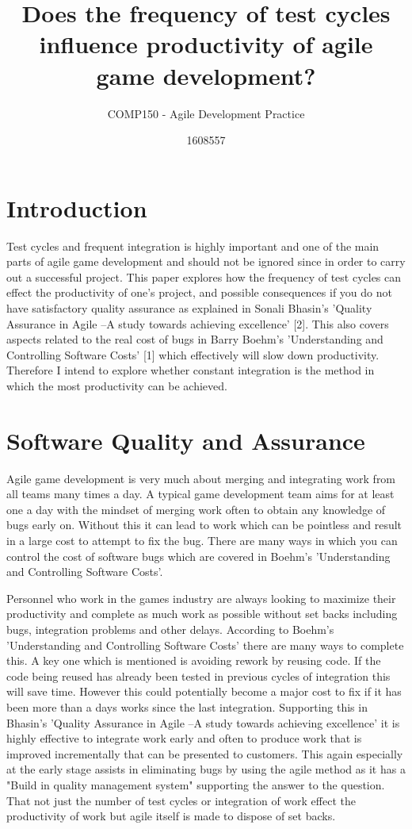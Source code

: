 \documentclass{scrartcl}
\title{Does the frequency of test cycles influence productivity of agile game development? }
\subtitle{COMP150 - Agile Development Practice}
\author{1608557}
\begin{document}
\maketitle



\section{Introduction}

Test cycles and frequent integration is highly important and one of the main parts of agile game development and should not be ignored since in order to carry out a successful project. This paper explores how the frequency of test cycles can effect the productivity of one's project, and possible consequences if you do not have satisfactory quality assurance as explained in Sonali Bhasin's 'Quality Assurance in Agile –A study towards achieving excellence' [2]. This also covers aspects related to the real cost of bugs in Barry Boehm's 'Understanding and Controlling Software Costs' [1]  which effectively will slow down productivity. Therefore I intend to explore whether constant integration is the method in which the most productivity can be achieved. 


\section{Software Quality and Assurance}

Agile game development is very much about merging and integrating work from all teams many times a day. A typical game development team aims for at least one a day with the mindset of merging work often to obtain any knowledge of bugs early on. Without this it can lead to work which can be pointless and result in a large cost to attempt to fix the bug. There are many ways in which you can control the cost of software bugs which are covered in Boehm's 'Understanding and Controlling Software Costs'.  

Personnel who work in the games industry are always looking to maximize their productivity  and complete as much work as possible without set backs including bugs, integration problems and other delays. According to Boehm's 'Understanding and Controlling Software Costs' there are many ways to complete this. A key one which is mentioned is avoiding rework by reusing code. If the code being reused has already been tested in previous cycles of integration this will save time. However this could potentially become a major cost to fix if it has been more than a days works since  the last integration. Supporting this in Bhasin's 'Quality Assurance in Agile –A study towards achieving excellence' it is highly effective to integrate work early and often to produce work that is improved incrementally that can be presented to customers. This again especially at the early stage assists in eliminating bugs by using the agile method as it has a "Build in quality management system" supporting the answer to the question. That not just the number of test cycles or integration of work effect the productivity of work but agile itself is made to dispose of set backs. 
\end{document}
